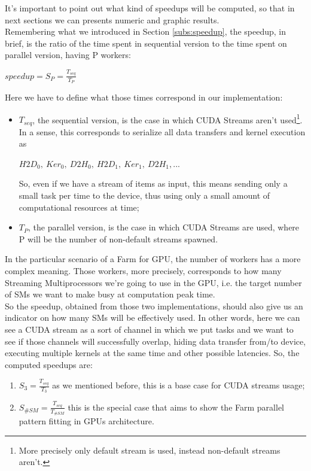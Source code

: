 It's important to point out what kind of speedups will be computed, so that in next sections we can presents numeric and graphic results.\\
Remembering what we introduced in Section \ref{subs:speedup}, the speedup, in brief, is the ratio of the time spent in sequential version to the time spent on parallel version, having P workers:
\begin{center}
	\(speedup = S_{P} = \frac{T_{seq}}{T_{P}} \)
\end{center}
Here we have to define what those times correspond in our implementation:
\begin{itemize}
	\item \(T_{seq}\), the sequential version, is the case in which CUDA Streams aren't used\footnote{More precisely only default stream is used, instead non-default streams aren't.}. In a sense, this corresponds to serialize all data transfers and kernel execution as
	\begin{center}
		\(H2D_{0},\ Ker_{0},\ D2H_{0},\ H2D_{1},\ Ker_{1},\ D2H_{1}, . . .\)
	\end{center}
	So, even if we have a stream of items as input, this means sending only a small task per time to the device, thus using only a small amount of computational resources at time;
	\item \(T_{P}\), the parallel version, is the case in which CUDA Streams are used, where P will be the number of non-default streams spawned.
\end{itemize}
In the particular scenario of a Farm for GPU, the number of workers has a more complex meaning. Those workers, more precisely, corresponds to how many Streaming Multiprocessors we're going to use in the GPU, i.e. the target number of SMs we want to make busy at computation peak time.\\
So the speedup, obtained from those two implementations, should also give us an indicator on how many SMs will be effectively used.
In other words, here we can see a CUDA stream as a sort of channel in which we put tasks and we want to see if those channels will successfully overlap, hiding data transfer from/to device, executing multiple kernels at the same time and other possible latencies.
So, the computed speedups are:
\begin{enumerate}
	\item \(S_{3} = \frac{T_{seq}}{T_{3}} \) as we mentioned before, this is a base case for CUDA streams usage;
	\item \(S_{\#SM} = \frac{T_{seq}}{T_{\#SM}} \) this is the special case that aims to show the Farm parallel pattern fitting in GPUs architecture.\\
\end{enumerate}

